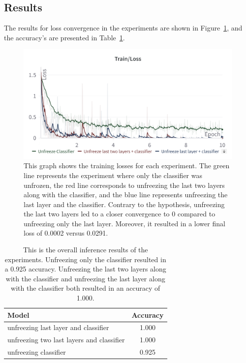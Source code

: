 \documentclass[10pt,twocolumn,letterpaper]{article}
\begin{document}
\subsection{Results}
The results for loss convergence in the experiments are shown in Figure~\ref{fig/Loss}, and the accuracy's are presented in Table~\ref{tab:Acc}.

\begin{figure}[h!] 
\centering \includegraphics[width=1\linewidth]{Loss Graph (4).png} \caption{ This graph shows the training losses for each experiment. The green line represents the experiment where only the classifier was unfrozen, the red line corresponds to unfreezing the last two layers along with the classifier, and the blue line represents unfreezing the last layer and the classifier. Contrary to the hypothesis, unfreezing the last two layers led to a closer convergence to 0 compared to unfreezing only the last layer. Moreover, it resulted in a lower final loss of 0.0002 versus 0.0291.} 
\label{fig/Loss} 
\end{figure}

\begin{table}[h!]
\begin{center}
\begin{tabular}{|l|c|}
\hline
\textbf{Model} & \textbf{Accuracy} \\
\hline\hline
unfreezing  last layer and  classifier& 1.000 \\
unfreezing  two last layers and  classifier & {1.000} \\
unfreezing classifier & 0.925\\
\hline
\end{tabular}
\end{center}
\caption{This is the overall inference results of the experiments. Unfreezing only the classifier resulted in a 0.925 accuracy. Unfreezing the last two layers along with the classifier and unfreezing the last layer along with the classifier both resulted in an accuracy of 1.000. }
\label{tab:Acc}
\end{table}
\end{document}
